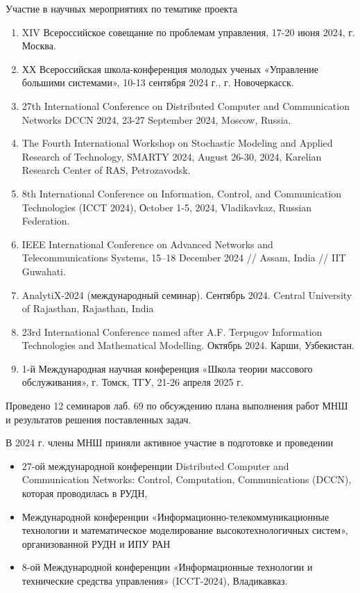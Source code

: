 \documentclass[10pt]{beamer}
\begin{document}
\begin{frame}[allowframebreaks]{Участие в научных мероприятиях по тематике проекта}
 \justifying
\begin{footnotesize}
 \begin{enumerate}
 \justifying
\item XIV Всероссийское совещание по проблемам управления, 17-20 июня 2024, г. Москва.
\item  ХХ Всероссийская школа-конференция молодых ученых «Управление большими системами», 10-13 сентября 2024 г., г. Новочеркасск.
\item 27th International Conference on Distributed Computer and Communication Networks DCCN 2024, 23-27 September 2024, Moscow, Russia.
\item The Fourth International Workshop on Stochastic Modeling and Applied Research of Technology, SMARTY 2024, August 26-30, 2024, Karelian Research Center of RAS, Petrozavodsk.
\item 8th International Conference on Information, Control, and Communication Technologies (ICCT 2024), Оctober 1-5, 2024, Vladikavkaz, Russian Federation.
\item IEEE International Conference on Advanced Networks and Telecommunications Systems, 15–18 December 2024 // Assam, India // IIT Guwahati.
\item AnalytiX-2024 (международный семинар). Сентябрь 2024. Central University of Rajasthan, Rajasthan, India 
\item 23rd International Conference named after A.F. Terpugov Information Technologies and Mathematical Modelling. Октябрь 2024. Карши, Узбекистан.
\item 1-й Международная научная конференция «Школа теории массового обслуживания», г. Томск, ТГУ, 21-26 апреля 2025 г.
\end{enumerate}
\end{footnotesize}

\bigskip

Проведено 12 семинаров лаб. 69 по обсуждению плана выполнения работ МНШ и результатов решения поставленных задач.

\bigskip

В 2024 г. члены МНШ приняли активное участие в подготовке и проведении
\begin{small}
\begin{itemize}
\justifying
    \item 27-ой международной конференции Distributed Computer and Communication Networks: Control, Computation, Communications (DCCN), которая проводилась в РУДН,
    \item Международной конференции «Информационно-телекоммуникационные технологии и математическое моделирование высокотехнологичных систем», организованной РУДН и ИПУ РАН
    \item 8-ой Международной конференции «Информационные технологии и технические средства управления» (ICCT-2024), Владикавказ. 
\end{itemize}  
\end{small}
\end{frame}
\end{document}
